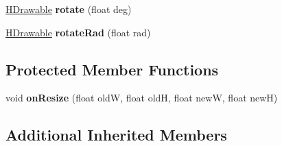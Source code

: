 \begin{DoxyCompactItemize}
\item 
\hypertarget{classhype_1_1core_1_1drawable_1_1_h_stage_a4b305733a2a18d6f3bc998355aa69a03}{\hyperlink{classhype_1_1core_1_1drawable_1_1_h_drawable}{H\-Drawable} {\bfseries rotate} (float deg)}\label{classhype_1_1core_1_1drawable_1_1_h_stage_a4b305733a2a18d6f3bc998355aa69a03}

\item 
\hypertarget{classhype_1_1core_1_1drawable_1_1_h_stage_ac3eff74da94b587a40689503dc74bfa5}{\hyperlink{classhype_1_1core_1_1drawable_1_1_h_drawable}{H\-Drawable} {\bfseries rotate\-Rad} (float rad)}\label{classhype_1_1core_1_1drawable_1_1_h_stage_ac3eff74da94b587a40689503dc74bfa5}

\end{DoxyCompactItemize}
\subsection*{Protected Member Functions}
\begin{DoxyCompactItemize}
\item 
\hypertarget{classhype_1_1core_1_1drawable_1_1_h_stage_a1cb882a27bf39bde49e9c39805cff7f3}{void {\bfseries on\-Resize} (float old\-W, float old\-H, float new\-W, float new\-H)}\label{classhype_1_1core_1_1drawable_1_1_h_stage_a1cb882a27bf39bde49e9c39805cff7f3}

\end{DoxyCompactItemize}
\subsection*{Additional Inherited Members}


